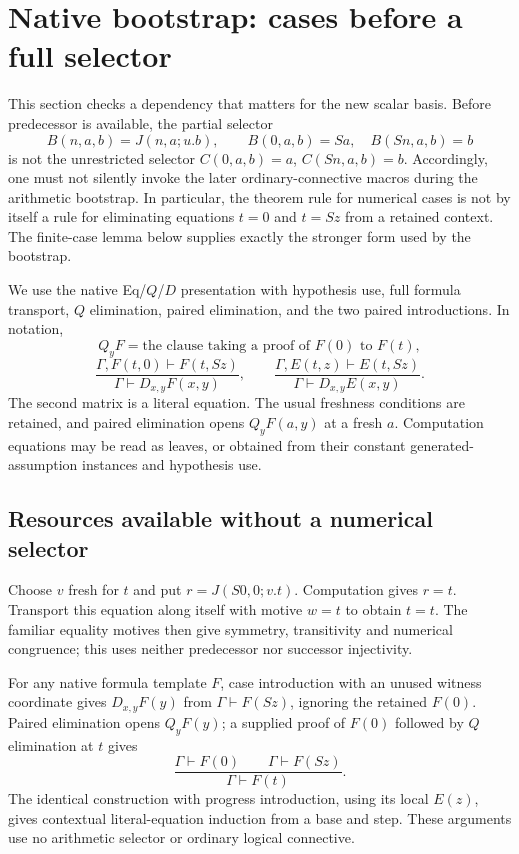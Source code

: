 
\section{Native bootstrap: cases before a full selector}
\label{nb:section}

This section checks a dependency that matters for the new scalar basis.
Before predecessor is available, the partial selector
\[
 B(n,a,b)=J(n,a;u.b),\qquad B(0,a,b)=Sa,\quad B(Sn,a,b)=b
\]
is not the unrestricted selector $C(0,a,b)=a$, $C(Sn,a,b)=b$.
Accordingly, one must not silently invoke the later ordinary-connective
macros during the arithmetic bootstrap.  In particular, the theorem rule
for numerical cases is not by itself a rule for eliminating equations
$t=0$ and $t=Sz$ from a retained context.  The finite-case lemma below
supplies exactly the stronger form used by the bootstrap.

We use the native Eq/$Q$/$D$ presentation with hypothesis use, full
formula transport, $Q$ elimination, paired elimination, and the two
paired introductions.  In notation,
\[
 Q_yF=\text{the clause taking a proof of }F(0)\text{ to }F(t),
\]
\[
 \frac{\Gamma,F(t,0)\vdash F(t,Sz)}
      {\Gamma\vdash D_{x,y}F(x,y)},\qquad
 \frac{\Gamma,E(t,z)\vdash E(t,Sz)}
      {\Gamma\vdash D_{x,y}E(x,y)}.
\]
The second matrix is a literal equation.  The usual freshness conditions
are retained, and paired elimination opens $Q_yF(a,y)$ at a fresh $a$.
Computation equations may be read as leaves, or obtained from their
constant generated-assumption instances and hypothesis use.

\subsection{Resources available without a numerical selector}

Choose $v$ fresh for $t$ and put $r=J(S0,0;v.t)$.  Computation gives
$r=t$.  Transport this equation along itself with motive $w=t$ to obtain
$t=t$.  The familiar equality motives then give symmetry, transitivity
and numerical congruence; this uses neither predecessor nor successor
injectivity.

For any native formula template $F$, case introduction with an unused
witness coordinate gives $D_{x,y}F(y)$ from
$\Gamma\vdash F(Sz)$, ignoring the retained $F(0)$.  Paired elimination
opens $Q_yF(y)$; a supplied proof of $F(0)$ followed by $Q$ elimination
at $t$ gives
\[
 \frac{\Gamma\vdash F(0)\qquad\Gamma\vdash F(Sz)}
      {\Gamma\vdash F(t)}. \tag{Native NC}\label{nb:nc}
\]
The identical construction with progress introduction, using its local
$E(z)$, gives contextual literal-equation induction from a base and step.
These arguments use no arithmetic selector or ordinary logical connective.

